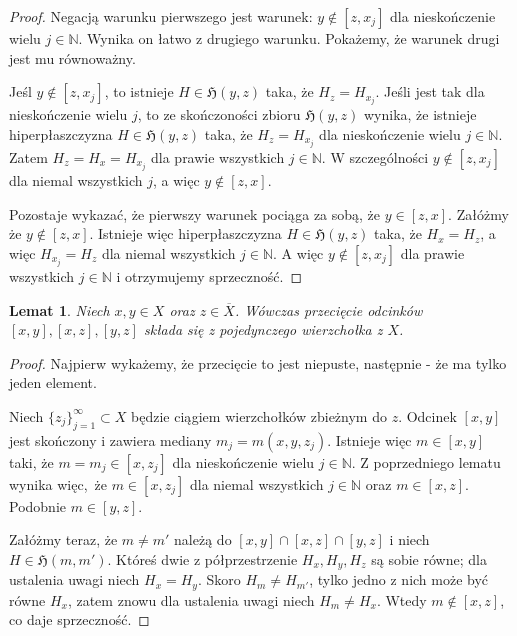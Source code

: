 \documentclass[licencjacka]{pracamgr}
\theoremstyle{definition}
\theoremstyle{definition}
\theoremstyle{definition}
\theoremstyle{definition}
\theoremstyle{definition}
\theoremstyle{plain}
\newtheorem{lemma}{Lemat}[section]
\theoremstyle{plain}
\begin{document}
\begin{proof}
	Negacją warunku pierwszego jest warunek: $ y \notin [z,x_j] $ dla nieskończenie 
	wielu $ j \in \mathbb{N} $. Wynika on łatwo z drugiego warunku. Pokażemy, że warunek 
	drugi jest mu równoważny.
	
	Jeśl $ y \notin [z,x_j]  $, to istnieje $ H \in \mathfrak{H}(y,z) $ taka, że 
	$ H_z = H_{x_j} $. %
	Jeśli jest tak dla nieskończenie wielu $ j $, to ze skończoności zbioru 
	$ \mathfrak{H}(y,z) $ wynika, że istnieje hiperpłaszczyzna 
	$ H \in \mathfrak{H}(y,z)$ taka, że $ H_{z} = H_{x_j} $ dla nieskończenie wielu $ j \in 
	\mathbb{N} $. Zatem $ H_z = H_x = H_{x_j} $ dla prawie wszystkich $ j \in \mathbb{N} $. 
	W szczególności $ y \notin [z,x_j] $ dla niemal wszystkich $ j $, a więc 
	$ y \notin [z,x] $.
	
	Pozostaje wykazać, że pierwszy warunek pociąga za sobą, że $ y \in [z,x] $.
	Załóżmy że $ y \notin [z,x] $. Istnieje więc hiperpłaszczyzna  
	$ H \in \mathfrak{H}(y,z) $ taka, że $ H_x = H_z $, a więc $ H_{x_j} = H_{z} $ dla 
	niemal wszystkich $ j \in \mathbb{N} $. A więc $ y \notin [z,x_j] $ dla 
	prawie wszystkich $ j \in \mathbb{N} $ i otrzymujemy sprzeczność.
\end{proof}

\begin{lemma}
	Niech $ x,y \in X $ oraz $ z \in \overline{X} $. Wówczas przecięcie odcinków 
	$ [x,y], [x,z], [y,z] $ składa się z pojedynczego wierzchołka z $ X $.
\end{lemma}
\begin{proof}
	Najpierw wykażemy, że przecięcie to jest niepuste, następnie - że ma tylko jeden element.

	Niech $ \{z_j\}_{j = 1}^{\infty} \subset X $ będzie ciągiem wierzchołków zbieżnym 
	do $ z $. Odcinek $[x,y] $ jest skończony i zawiera mediany $ m_j = m(x,y,z_j) $. 
	Istnieje więc $ m \in [x,y] $ taki, że $ m = m_j \in [x,z_j] $ dla nieskończenie 
	wielu $ j \in \mathbb{N} $. Z poprzedniego lematu wynika więc, że $ m \in [x,z_j] $ dla 
	niemal wszystkich $ j \in \mathbb{N} $ oraz $ m \in [x,z] $. Podobnie $ m \in [y,z] $.

	Załóżmy teraz, że $ m \neq m' $ należą do $ [x,y] \cap [x,z] \cap [y,z] $ i niech 
	$ H \in \mathfrak{H}(m,m') $. Któreś dwie z półprzestrzenie $ H_x, H_y, H_z $ są 
	sobie równe; dla ustalenia uwagi niech $ H_x = H_y $. Skoro $ H_m \neq H_{m'} $, 
	tylko jedno z nich może być równe $ H_x $, zatem znowu dla ustalenia uwagi niech 
	$ H_m \neq H_x $. Wtedy $ m \notin [x,z] $, co daje sprzeczność.
\end{proof}
\end{document}
